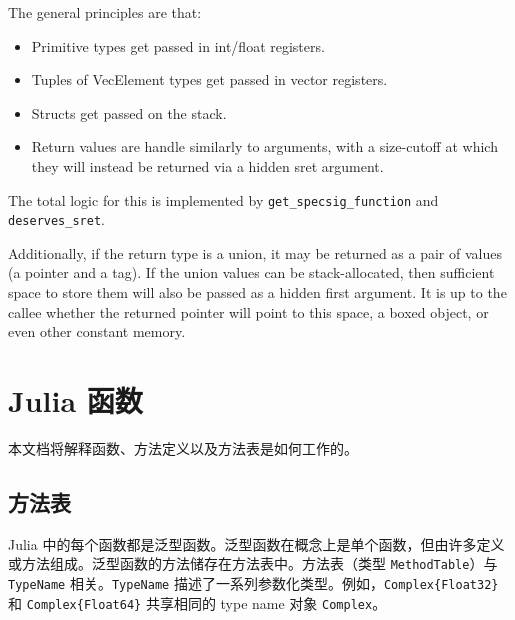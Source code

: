 The general principles are that:



\begin{itemize}
\item Primitive types get passed in int/float registers.


\item Tuples of VecElement types get passed in vector registers.


\item Structs get passed on the stack.


\item Return values are handle similarly to arguments, with a size-cutoff at which they will instead be returned via a hidden sret argument.

\end{itemize}


The total logic for this is implemented by \texttt{get\_specsig\_function} and \texttt{deserves\_sret}.



Additionally, if the return type is a union, it may be returned as a pair of values (a pointer and a tag). If the union values can be stack-allocated, then sufficient space to store them will also be passed as a hidden first argument. It is up to the callee whether the returned pointer will point to this space, a boxed object, or even other constant memory.



\hypertarget{3539827185509825766}{}


\section{Julia 函数}



本文档将解释函数、方法定义以及方法表是如何工作的。



\hypertarget{6316722227009052903}{}


\subsection{方法表}



Julia 中的每个函数都是泛型函数。泛型函数在概念上是单个函数，但由许多定义或方法组成。泛型函数的方法储存在方法表中。方法表（类型 \texttt{MethodTable}）与 \texttt{TypeName} 相关。\texttt{TypeName} 描述了一系列参数化类型。例如，\texttt{Complex\{Float32\}} 和 \texttt{Complex\{Float64\}} 共享相同的 type name 对象 \texttt{Complex}。



